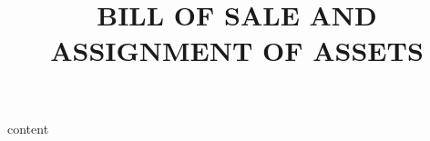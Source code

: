\documentclass[12pt]{scrartcl}
\title{BILL OF SALE AND ASSIGNMENT OF ASSETS}
\begin{document}
\maketitle
{content}
\end{document}
